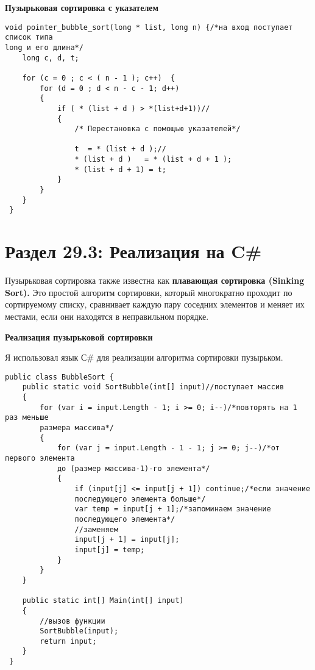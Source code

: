 \vspace{\baselineskip}

\textbf{Пузырьковая сортировка с указателем} 

\vspace{\baselineskip}

\begin{tcolorbox} 
\begin{verbatim}
void pointer_bubble_sort(long * list, long n) {/*на вход поступает список типа 
long и его длина*/
	long c, d, t;
 
	for (c = 0 ; c < ( n - 1 ); c++)  {
		for (d = 0 ; d < n - c - 1; d++)
		{
			if ( * (list + d ) > *(list+d+1))//
			{
				/* Перестановка с помощью указателей*/
 
				t  = * (list + d );//
				* (list + d )   = * (list + d + 1 );
				* (list + d + 1) = t;
			}
		}
	}
 }
\end{verbatim}
\end{tcolorbox}

\section*{Раздел 29.3: Реализация на C\#}

\vspace{\baselineskip}

Пузырьковая сортировка также известна как \textbf{плавающая сортировка (Sinking Sort).} Это простой алгоритм сортировки, который многократно проходит по сортируемому списку, сравнивает каждую пару соседних элементов и меняет их местами, если они находятся в неправильном порядке.

\vspace{\baselineskip}

 \textbf{Реализация пузырьковой сортировки}
 
 
 
 Я использовал язык С\# для реализации алгоритма сортировки пузырьком.
 
 \vspace{\baselineskip}
 
\begin{tcolorbox} 
\begin{verbatim}
public class BubbleSort {
	public static void SortBubble(int[] input)//поступает массив
	{
		for (var i = input.Length - 1; i >= 0; i--)/*повторять на 1 раз меньше 
		размера массива*/
		{
			for (var j = input.Length - 1 - 1; j >= 0; j--)/*от первого элемента
			до (размер массива-1)-го элемента*/
			{
				if (input[j] <= input[j + 1]) continue;/*если значение 
				последующего элемента больше*/
				var temp = input[j + 1];/*запоминаем значение 
				последующего элемента*/
				//заменяем
				input[j + 1] = input[j];
				input[j] = temp;
			}
		}
	}

	public static int[] Main(int[] input)
	{
		//вызов функции
		SortBubble(input);
		return input;
	}
 }
\end{verbatim}
\end{tcolorbox}

